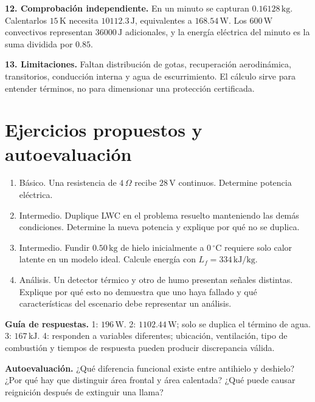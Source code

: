 \textbf{12. Comprobación independiente.} En un minuto se capturan $0.16128\,\mathrm{kg}$. Calentarlos $15\,\mathrm{K}$ necesita $10112.3\,\mathrm{J}$, equivalentes a $168.54\,\mathrm{W}$. Los $600\,\mathrm{W}$ convectivos representan $36000\,\mathrm{J}$ adicionales, y la energía eléctrica del minuto es la suma dividida por $0.85$.

\textbf{13. Limitaciones.} Faltan distribución de gotas, recuperación aerodinámica, transitorios, conducción interna y agua de escurrimiento. El cálculo sirve para entender términos, no para dimensionar una protección certificada.

\section{Ejercicios propuestos y autoevaluación}
\begin{enumerate}
\item Básico. Una resistencia de $4\,\Omega$ recibe $28\,\mathrm{V}$ continuos. Determine potencia eléctrica.
\item Intermedio. Duplique LWC en el problema resuelto manteniendo las demás condiciones. Determine la nueva potencia y explique por qué no se duplica.
\item Intermedio. Fundir $0.50\,\mathrm{kg}$ de hielo inicialmente a $0\,{}^\circ\mathrm{C}$ requiere solo calor latente en un modelo ideal. Calcule energía con $L_f=334\,\mathrm{kJ/kg}$.
\item Análisis. Un detector térmico y otro de humo presentan señales distintas. Explique por qué esto no demuestra que uno haya fallado y qué características del escenario debe representar un análisis.
\end{enumerate}
\textbf{Guía de respuestas.} 1: $196\,\mathrm{W}$. 2: $1102.44\,\mathrm{W}$; solo se duplica el término de agua. 3: $167\,\mathrm{kJ}$. 4: responden a variables diferentes; ubicación, ventilación, tipo de combustión y tiempos de respuesta pueden producir discrepancia válida.

\textbf{Autoevaluación.} ¿Qué diferencia funcional existe entre antihielo y deshielo? ¿Por qué hay que distinguir área frontal y área calentada? ¿Qué puede causar reignición después de extinguir una llama?
